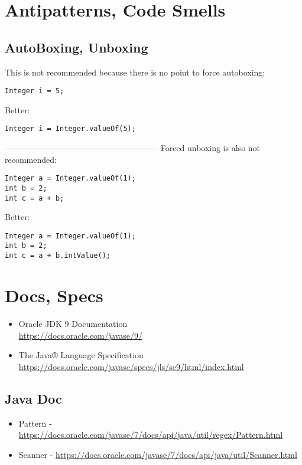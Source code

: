 \documentclass{report}
\begin{document}
\chapter{Antipatterns, Code Smells}
\section{AutoBoxing, Unboxing}
This is not recommended because there is no point to force autoboxing:
\begin{verbatim}
Integer i = 5;
\end{verbatim}
Better:
\begin{verbatim}
Integer i = Integer.valueOf(5);
\end{verbatim}
--------------------------------------------------------
Forced unboxing is also not recommended:
\begin{verbatim}
Integer a = Integer.valueOf(1);
int b = 2;
int c = a + b;
\end{verbatim}
Better:
\begin{verbatim}
Integer a = Integer.valueOf(1);
int b = 2;
int c = a + b.intValue();
\end{verbatim}

\chapter{Docs, Specs}
\begin{itemize}
\item Oracle JDK 9 Documentation\\
\url{https://docs.oracle.com/javase/9/}
\item The Java® Language Specification\\
\url{https://docs.oracle.com/javase/specs/jls/se9/html/index.html}
\end{itemize}

\section{Java Doc}
\begin{itemize}
\item Pattern - \url{https://docs.oracle.com/javase/7/docs/api/java/util/regex/Pattern.html}
\item Scanner - \url{https://docs.oracle.com/javase/7/docs/api/java/util/Scanner.html}
\end{itemize}
\end{document}
